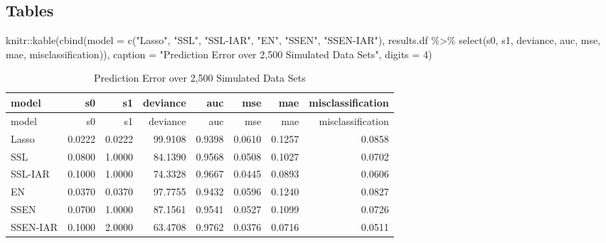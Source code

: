 \documentclass[
]{article}
\newenvironment{Shaded}{\begin{snugshade}}{\end{snugshade}}
\newcommand{\AttributeTok}[1]{\textcolor[rgb]{0.77,0.63,0.00}{#1}}
\newcommand{\DecValTok}[1]{\textcolor[rgb]{0.00,0.00,0.81}{#1}}
\newcommand{\FunctionTok}[1]{\textcolor[rgb]{0.00,0.00,0.00}{#1}}
\newcommand{\NormalTok}[1]{#1}
\newcommand{\SpecialCharTok}[1]{\textcolor[rgb]{0.00,0.00,0.00}{#1}}
\newcommand{\StringTok}[1]{\textcolor[rgb]{0.31,0.60,0.02}{#1}}
\begin{document}
\hypertarget{tables}{%
\subsection{Tables}\label{tables}}

\begin{Shaded}
\begin{Highlighting}[]
\NormalTok{knitr}\SpecialCharTok{::}\FunctionTok{kable}\NormalTok{(}\FunctionTok{cbind}\NormalTok{(}\AttributeTok{model =} \FunctionTok{c}\NormalTok{(}\StringTok{"Lasso"}\NormalTok{, }\StringTok{"SSL"}\NormalTok{, }\StringTok{"SSL{-}IAR"}\NormalTok{,}
                             \StringTok{"EN"}\NormalTok{, }\StringTok{"SSEN"}\NormalTok{, }\StringTok{"SSEN{-}IAR"}\NormalTok{), }
\NormalTok{                   results.df }\SpecialCharTok{\%\textgreater{}\%} 
                     \FunctionTok{select}\NormalTok{(s0, s1, deviance, auc, mse, mae, misclassification)),}
             \AttributeTok{caption =} \StringTok{"Prediction Error over 2,500 Simulated Data Sets"}\NormalTok{,}
             \AttributeTok{digits =} \DecValTok{4}\NormalTok{)}
\end{Highlighting}
\end{Shaded}

\begin{longtable}[]{@{}lrrrrrrr@{}}
\caption{Prediction Error over 2,500 Simulated Data Sets}\tabularnewline
\toprule
model & s0 & s1 & deviance & auc & mse & mae & misclassification \\
\midrule
\endfirsthead
\toprule
model & s0 & s1 & deviance & auc & mse & mae & misclassification \\
\midrule
\endhead
Lasso & 0.0222 & 0.0222 & 99.9108 & 0.9398 & 0.0610 & 0.1257 & 0.0858 \\
SSL & 0.0800 & 1.0000 & 84.1390 & 0.9568 & 0.0508 & 0.1027 & 0.0702 \\
SSL-IAR & 0.1000 & 1.0000 & 74.3328 & 0.9667 & 0.0445 & 0.0893 &
0.0606 \\
EN & 0.0370 & 0.0370 & 97.7755 & 0.9432 & 0.0596 & 0.1240 & 0.0827 \\
SSEN & 0.0700 & 1.0000 & 87.1561 & 0.9541 & 0.0527 & 0.1099 & 0.0726 \\
SSEN-IAR & 0.1000 & 2.0000 & 63.4708 & 0.9762 & 0.0376 & 0.0716 &
0.0511 \\
\bottomrule
\end{longtable}
\end{document}
